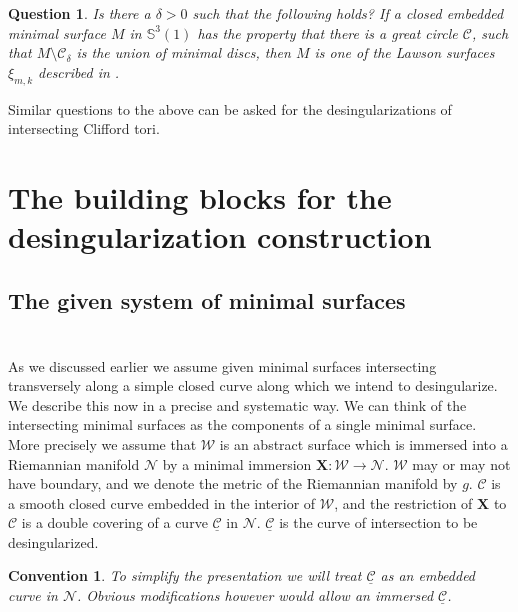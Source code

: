 \documentclass[12pt,namelimits,sumlimits]{amsart}
\newtheorem{convention}[theorem]{Convention}
\newtheorem{question}[theorem]{Question}
\theoremstyle{remark}
\numberwithin{equation}{section}
\begin{document}
\addtocounter{equation}{1}
\begin{question}
\label{QLtwo}
Is there a $\delta>0$ such that the following holds?
If a closed embedded minimal surface $M$ in ${\mathbb{S}}^3(1)$ has the property that there is a great circle ${{\mathcal{C}}}$,
such that $M\setminus {{\mathcal{C}}}_\delta$ is the union of minimal discs,
then $M$ is one of the Lawson surfaces $\xi_{m,k}$ described in \cite{L2}.
\end{question}

Similar questions to the above can be asked for the desingularizations of intersecting Clifford tori.

\section{The building blocks for the desingularization construction}
\label{Sbuildingblocks}
\nopagebreak

\subsection*{The given system of minimal surfaces}
$\phantom{ab}$
\nopagebreak

As we discussed earlier we assume given minimal surfaces intersecting transversely along
a simple closed curve along which we intend to desingularize.
We describe this now in a precise and systematic way.
We can think of the intersecting minimal surfaces as the components of a single
minimal surface.
More precisely we assume that ${{\mathcal{W}}}$ is an abstract surface which is immersed into a
Riemannian manifold ${{\mathcal{N}}}$ by a minimal immersion ${\boldsymbol{X}}:{{\mathcal{W}}}\to{{\mathcal{N}}}$.
${{\mathcal{W}}}$ may or may not have boundary, and we denote the metric of the Riemannian manifold by $g$.
${{\mathcal{C}}}$ is a smooth closed curve embedded in the interior of ${{\mathcal{W}}}$,
and the restriction of ${\boldsymbol{X}}$ to ${{\mathcal{C}}}$ is a double covering of a curve ${\underline{{\mathcal{C}}}}$ in ${{\mathcal{N}}}$.
${\underline{{\mathcal{C}}}}$ is the curve of intersection to be desingularized.

\addtocounter{equation}{1}
\begin{convention}
\label{CCunder}
To simplify the presentation we will treat ${\underline{{\mathcal{C}}}}$ as an embedded curve in ${{\mathcal{N}}}$.
Obvious modifications however would allow an immersed ${\underline{{\mathcal{C}}}}$.
\end{convention}
\end{document}
